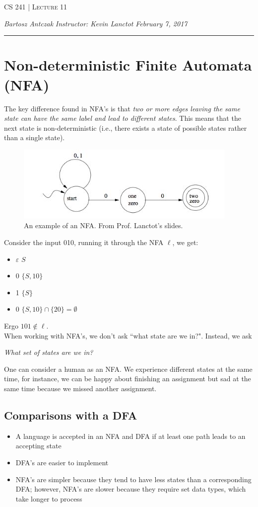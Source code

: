 \documentclass{report}
\newcommand{\lectureNum}{11}
\newcommand{\curDate}{February 7, 2017}
\newcommand{\course}{CS 241}
\newcommand{\instructor}{Kevin Lanctot}
\begin{document}
\begin{center}
\begin{Large}
\textsc{\course{} | Lecture \lectureNum{}}
\end{Large}
\end{center} 
\noindent \textit{Bartosz Antczak} \hfill
\textit{Instructor: \instructor{}} \hfill
\textit{\curDate{}}
\rule{\textwidth}{0.4pt}
\section{Non-deterministic Finite Automata (NFA)}
The key difference found in NFA's is that \textit{two or more edges leaving the same state can have the same label and lead to different states}. This means that the next state is non-deterministic (i.e., there exists a state of possible states rather than a single state).
\begin{figure}[ht]
\begin{center}
\includegraphics[scale=1]{nfa.jpg}
\end{center}
\caption{An example of an NFA. From Prof. Lanctot's slides.}
\end{figure}
Consider the input 010, running it through the NFA $\ell$, we get:
\begin{itemize}
\item $\varepsilon$ $S$
\item 0 $\{S, 10\}$
\item 1 $\{S\}$
\item 0 $\{S, 10\} \cap \{20\} = \emptyset$
\end{itemize}
Ergo $101 \not\in \ell$.\\
When working with NFA's, we don't ask ``what state are we in?". Instead, we ask
\begin{center}
\textit{What set of states are we in?}
\end{center}
One can consider a human as an NFA. We experience different states at the same time, for instance, we can be happy about finishing an assignment but sad at the same time because we missed another assignment.\\
\subsection{Comparisons with a DFA}
\begin{itemize}
\item A language is accepted in an NFA and DFA if at least one path leads to an accepting state
\item DFA's are easier to implement
\item NFA's are simpler because they tend to have less states than a corresponding DFA; however, NFA's are slower because they require set data types, which take longer to process
\end{itemize} \newpage
\end{document}
